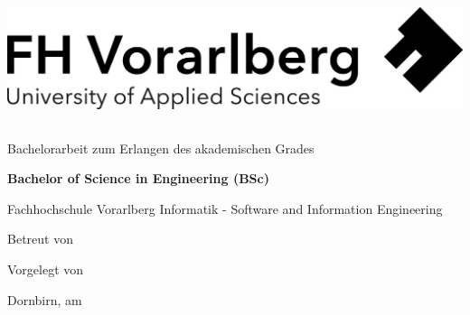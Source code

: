 \raggedbottom

\cleardoublepage   %
\setcounter{tocdepth}{3}
\thispagestyle{empty}

\begin{titlepage}
  \begin{flushright}
  \includegraphics[width=0.4\linewidth]{images/Logo-A3.jpg}
  \end{flushright}
  
  \begin{flushleft}
  \section*{\papertitle}
  \vspace{1cm}
  
  \vspace{0.5cm}
  Bachelorarbeit\newline
  zum Erlangen des akademischen Grades\newline

  \vspace{0.5cm}
  \textbf{Bachelor of Science in Engineering (BSc)}

  \vspace{1cm}
  Fachhochschule Vorarlberg\newline
  Informatik - Software and Information Engineering\newline
  
  \vspace{0.5cm}
  Betreut von\newline
  \papersupervisor
  
  \vspace{0.5cm} 
  Vorgelegt von\newline
  \paperauthor
  \end{flushleft}
  
  \vspace{0.5cm}
  Dornbirn, am \paperdate
\end{titlepage}
 
\clearpage